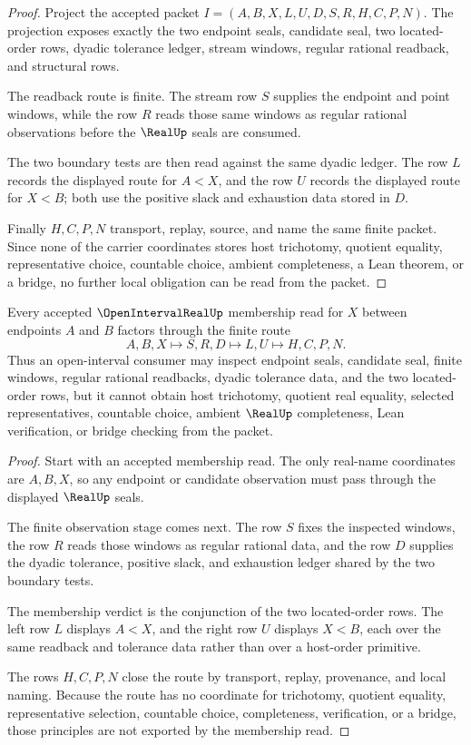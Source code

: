 \begin{proof}
Project the accepted packet $I=(A,B,X,L,U,D,S,R,H,C,P,N)$. The projection exposes exactly the two endpoint seals, candidate seal, two located-order rows, dyadic tolerance ledger, stream windows, regular rational readback, and structural rows.

The readback route is finite. The stream row $S$ supplies the endpoint and point windows, while the row $R$ reads those same windows as regular rational observations before the $\RealUp$ seals are consumed.

The two boundary tests are then read against the same dyadic ledger. The row $L$ records the displayed route for $A<X$, and the row $U$ records the displayed route for $X<B$; both use the positive slack and exhaustion data stored in $D$.

Finally $H,C,P,N$ transport, replay, source, and name the same finite packet. Since none of the carrier coordinates stores host trichotomy, quotient equality, representative choice, countable choice, ambient completeness, a Lean theorem, or a bridge, no further local obligation can be read from the packet.
\end{proof}

\begin{theorem}
\label{thm:open-interval-real-located-membership}
Every accepted $\OpenIntervalRealUp$ membership read for $X$ between endpoints $A$ and $B$ factors through the finite route
$$
A,B,X \longmapsto S,R,D \longmapsto L,U \longmapsto H,C,P,N .
$$
Thus an open-interval consumer may inspect endpoint seals, candidate seal, finite windows, regular rational readbacks, dyadic tolerance data, and the two located-order rows, but it cannot obtain host trichotomy, quotient real equality, selected representatives, countable choice, ambient $\RealUp$ completeness, Lean verification, or bridge checking from the packet.
\end{theorem}
\begin{proof}
Start with an accepted membership read. The only real-name coordinates are $A,B,X$, so any endpoint or candidate observation must pass through the displayed $\RealUp$ seals.

The finite observation stage comes next. The row $S$ fixes the inspected windows, the row $R$ reads those windows as regular rational data, and the row $D$ supplies the dyadic tolerance, positive slack, and exhaustion ledger shared by the two boundary tests.

The membership verdict is the conjunction of the two located-order rows. The left row $L$ displays $A<X$, and the right row $U$ displays $X<B$, each over the same readback and tolerance data rather than over a host-order primitive.

The rows $H,C,P,N$ close the route by transport, replay, provenance, and local naming. Because the route has no coordinate for trichotomy, quotient equality, representative selection, countable choice, completeness, verification, or a bridge, those principles are not exported by the membership read.
\end{proof}

